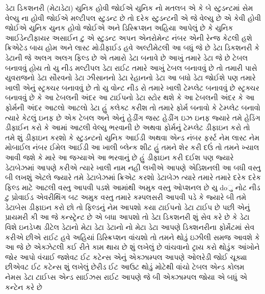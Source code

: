 \documentclass[aspectratio=169, 10pt]{beamer}
\begin{document}
\begin{frame}{ડેટા ડિકશનરી (મેટાડેટા)}
{યુનિક હોવી જોઈએ યુનિક નો મતલબ એ કે બે સ્ટુડન્ટમાં સેમ વેલ્યુ ના હોવી જોઈએ મલ્ટીપલ સ્ટુડન્ટ છે તો દરેક સ્ટુડન્ટની એ જે વેલ્યુ છે એ કેવી હોવી જોઈએ યુનિક યુનક હોવો જોઈએ અને ડિસ્ક્રિપ્શન અહિયા આપેલું છે કે યુનિક આઈડેન્ટીફાયર અસાઈન ટુ એ સ્ટુડન્ટ અપન એનરોમેન્ટ નંબર એની રેન્જ કેટલી હશે ક્રિએટેડ બાય હોમ અને લાસ્ટ મોડીફાઈડ હવે અલ્ટીમેટલી આ બધું જે છે ડેટા ડિકશનરી કે ડેટાની જે અલગ અલગ ફિલ્ડ છે એ તમારો ડેટા બનાવે છે આખું તમારે ડેટા જે છે ટેબલ બનાવવું હોય તો યુ નીડ મલ્ટીપલ ડેટા રાઈટ તમારે આખું ટેબલ બનાવવું છે તો તમારી પાસે યુવરાજનો ડેટા સૌરવનો ડેટા ઝીસાનનો ડેટા રેહાનનો ડેટા આ બધો ડેટા જોઈશે પણ તમારે ખાલી એનું સ્ટ્રક્ચર બનાવવું છે તો યુ વોન્ટ નીડ રો તમારે ખાલી ટેમ્પ્લેટ બનાવવું છે સ્ટ્રક્ચર બનાવવું છે કે આ ટેબલની અંદર આ ટાઈપનો ડેટા સ્ટોર થશે કે આ ટેબલની અંદર કે આ ફોર્મની અંદર આટલો આટલો ડેટા હું કલેક્ટ કરીશ તો તમારે ફોર્મ બનાવો કે ટેમ્પ્લેટ બનાવો ત્યારે કેટલું ઇનફ છે એક ટેબલ અને એનું હેડીંગ જસ્ટ હેડીંગ ઇઝ ઇનફ જ્યારે તમે હેડિંગ ડીફાઈન કરો કે આમાં આટલી વેલ્યુ ભરવાની છે અથવા ફોર્મનું ટેમ્પ્લેટ ડીફાઇન કરો તો તમે શું ડીફાઇન કરશો કે સ્ટુડન્ટનો યુનિક આઈડી અથવા એન્ડ નંબર ફર્સ્ટ નેમ લાસ્ટ નેમ મોબાઈલ નંબર ઈમેલ આઈડી આ ખાલી બ્લેન્ક શીટ હું તમને શેર કરી દઉં તો તમને ખ્યાલ આવી જશે કે મારે આ જગ્યાએ આ ભરવાનું છે હું ડીફાઇન કરી દઈશ પણ જ્યારે ડેટાબેઝમાં આપણે કરીએ ત્યારે ખાલી નામ નહી લખીએ આપણે એડિશનલી આ બધી વસ્તુ બી લખશું એટલે જ્યારે તમે ડેટાબેઝમાં ક્રિએટ કરશો ડેટાબેઝ ત્યારે તમારે તમારે દરેક દરેક ફિલ્ડ માટે આટલી વસ્તુ આપવી પડશે આમાંથી અમુક વસ્તુ ઓપ્શનલ છે યુ doુ નોટ નીડ ટુ પ્રોવાઈડ એવરીથિંગ બટ અમુક વસ્તુ તમારે કમ્પલસરી આપવી પડે કે જ્યારે બી તમે ડેટાબેસ ડીફાઇન કરો છો તો ફિલ્ડનું નેમ આપશો કયા ટાઈપનો ડેટા ટાઈપ છે પછી એનું પ્રાયમરી કી આ જે કન્સ્ટ્રેન્ટ છે એ બધા આપશો તો ડેટા ડિકશનરી શું સેવ કરે છે કે ડેટા વિશે ઇનડેપ્થ ડીટેલ ડેટાનો મેટા ડેટા ડેટાનો નો મેટા ડેટા આપણે ડિક્શનરીના ફોર્મેટમાં સેવ કરીએ છીએ રાઈટ હવે અહિયાં ડિસ્ક્રિપ્શન વાંચશો તો તમને થોડું ઇઝીલી સમજ આવશે કે આ જે છે એક્ઝેટલી કઈ રીતે કામ થાય છે શું લખેલું છે વાંચવાનો ટ્રાય કરો થોડુંક આંખોને જોર આપો વંચાઈ જશેવટ ઈટ કટેન્સ એનું એક્ઝામ્પલ આપણે ઓલરેડી જોઈ ચૂક્યા છીએવટ ઈટ કટેન્સ શું લખેલું છેરીડ ઈટ આઉટ થોડું મોટેથી વાંચો ટેબલ એન્ડ કોલમ નેમસ ડેટા ટાઈપ્સ એન્ડ સાઈઝસ રાઈટ આપણે જે બી એક્ઝામ્પલ જોયા એ બધું એ કન્ટેન કરે છે
}
\end{frame}
\end{document}
